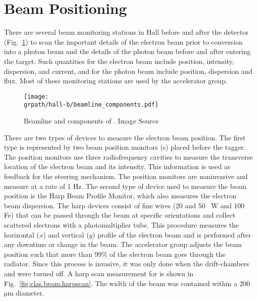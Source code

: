 \FloatBarrier
\section{Beam Positioning}\label{sec:clas.beam}
There are several beam monitoring stations in Hall  before and after the  detector (Fig.~\ref{fig:clas.beam.beforemonitors}) to scan the important details of the electron beam prior to conversion into a photon beam and the details of the photon beam before and after entering the target. Such quantities for the electron beam include position, intensity, dispersion, and current, and for the photon beam include position, dispersion and flux. Most of these monitoring stations are used by the accelerator group.
\begin{figure}[h!]\begin{center}
\texttt{[image: \\grpath/hall-b/beamline\_components.pdf]}
\caption[Beamline and components of ]{\label{fig:clas.beam.beforemonitors}{}Beamline and components of . Image Source~\cite{cebafflckr}}
\end{center}\end{figure}
There are two types of devices to measure the electron beam position. The first type is represented by two beam position monitors (s\label{abbr:bpm}) placed before the tagger. The position monitors use three radiofrequency cavities to measure the transverse location of the electron beam and its intensity. This information is used as feedback for the steering mechanism. The position monitors are noninvasive and measure at a rate of 1 Hz. 
The second type of device used to measure the beam position is the Harp Beam Profile Monitor, which also measures the electron beam dispersion. The harp devices consist of fine wires (20 and 50~{\um} W and 100~{\um} Fe) that can be passed through the beam at specific orientations and collect scattered electrons with a photomultiplier tube. This procedure measures the horizontal ($x$) and vertical ($y$) profile of the electron beam and is performed after any downtime or change in the beam. The accelerator group adjusts the beam position such that more than 99\% of the electron beam goes through the radiator. Since this process is invasive, it was only done when the drift-chambers and  were turned off. A harp scan measurement for  is shown in Fig.~\ref{fig:clas.beam.harpscan}. The width of the beam was contained within a 200 $\mathrm{\mu}$m diameter.



